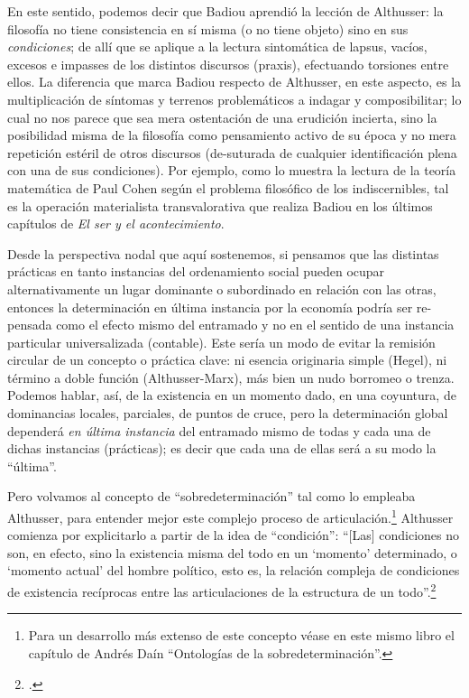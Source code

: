 En este sentido, podemos decir que Badiou aprendió la lección de Althusser: la filosofía no tiene consistencia en sí misma (o no tiene objeto) sino en sus \emph{condiciones}; de allí que se aplique a la lectura sintomática de lapsus, vacíos, excesos e impasses de los distintos discursos (praxis), efectuando torsiones entre ellos. La diferencia que marca Badiou respecto de Althusser, en este aspecto, es la multiplicación de síntomas y terrenos problemáticos a indagar y composibilitar; lo cual no nos parece que sea mera ostentación de una erudición incierta, sino la posibilidad misma de la filosofía como pensamiento activo de su época y no mera repetición estéril de otros discursos (de-suturada de cualquier identificación plena con una de sus condiciones). Por ejemplo, como lo muestra la lectura de la teoría matemática de Paul Cohen según el problema filosófico de los indiscernibles, tal es la operación materialista transvalorativa que realiza Badiou en los últimos capítulos de \emph{El ser y el acontecimiento}.

Desde la perspectiva nodal que aquí sostenemos, si pensamos que las distintas prácticas en tanto instancias del ordenamiento social pueden ocupar alternativamente un lugar dominante o subordinado en relación con las otras, entonces la determinación en última instancia por la economía podría ser re-pensada como el efecto mismo del entramado  y no en el sentido de una instancia particular universalizada (contable). Este sería un modo de evitar la remisión circular de un concepto o práctica clave: ni esencia originaria simple (Hegel), ni término a doble función (Althusser-Marx), más bien un nudo borromeo o trenza. Podemos hablar, así, de la existencia en un momento dado, en una coyuntura, de dominancias locales, parciales, de puntos de cruce, pero la determinación global dependerá \emph{en última instancia} del entramado mismo de todas y cada una de dichas instancias (prácticas); es decir que cada una de ellas será a su modo la \enquote{última}.

Pero volvamos al concepto de \enquote{sobredeterminación} tal como lo empleaba Althusser, para entender mejor este complejo proceso de articulación.\footnote{Para un desarrollo más extenso de este concepto véase en este mismo libro el capítulo de Andrés Daín \enquote{Ontologías de la sobredeterminación}.} Althusser comienza por explicitarlo a partir de la idea de \enquote{condición}: \enquote{{[}Las{]} condiciones no son, en efecto, sino la existencia misma del todo en un \enquote{momento} determinado, o \enquote{momento actual} del hombre político, esto es, la relación compleja de condiciones de existencia recíprocas entre las articulaciones de la estructura de un todo}.\footcite[Véase][171]{@7051-ALTHUSSER1965}

